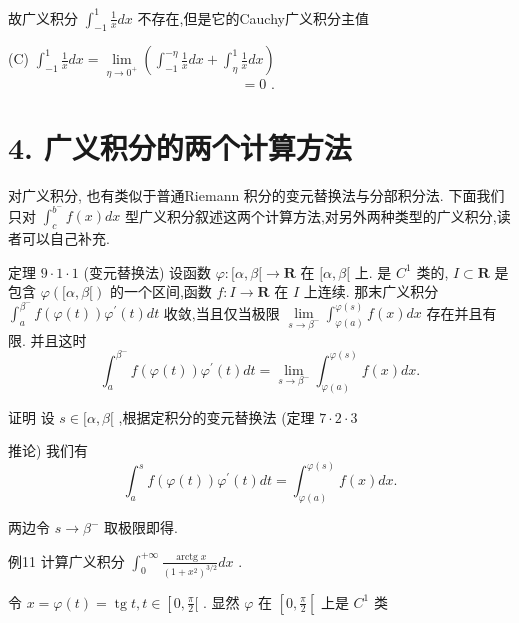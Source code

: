 故广义积分 ${\int }_{-1}^{1}\frac{1}{x}{dx}$ 不存在,但是它的Cauchy广义积分主值

(C) ${\int }_{-1}^{1}\frac{1}{x}{dx} = \mathop{\lim }\limits_{{\eta  \rightarrow  {0}^{ + }}}\left( {{\int }_{-1}^{-\eta }\frac{1}{x}{dx} + {\int }_{\eta }^{1}\frac{1}{x}{dx}}\right)$
$$= 0\text{ . }$$

\section*{4. 广义积分的两个计算方法}

对广义积分, 也有类似于普通Riemann 积分的变元替换法与分部积分法. 下面我们只对 ${\int }_{c}^{{b}^{ - }}f\left( x\right) {dx}$ 型广义积分叙述这两个计算方法,对另外两种类型的广义积分,读者可以自己补充.

定理 $9 \cdot  1 \cdot  1$ (变元替换法) 设函数 $\varphi  : \lbrack \alpha ,\beta \lbrack  \rightarrow  \mathbf{R}$ 在 $\lbrack \alpha ,\beta \lbrack$ 上. 是 ${C}^{1}$ 类的, $I \subset  \mathbf{R}$ 是包含 $\varphi \left( {\lbrack \alpha ,\beta \lbrack }\right)$ 的一个区间,函数 $f : I \rightarrow  \mathbf{R}$ 在 $I$ 上连续. 那末广义积分 ${\int }_{a}^{{\beta }^{ - }}f\left( {\varphi \left( t\right) }\right) {\varphi }^{\prime }\left( t\right) {dt}$ 收敛,当且仅当极限 $\mathop{\lim }\limits_{{s \rightarrow  {\beta }^{ - }}}{\int }_{\varphi \left( a\right) }^{\varphi \left( s\right) }f\left( x\right) {dx}$ 存在并且有限. 并且这时
$${\int }_{a}^{{\beta }^{ - }}f\left( {\varphi \left( t\right) }\right) {\varphi }^{\prime }\left( t\right) {dt} = \mathop{\lim }\limits_{{s \rightarrow  {\beta }^{ - }}}{\int }_{\varphi \left( a\right) }^{\varphi \left( s\right) }f\left( x\right) {dx}.$$

证明 设 $s \in  \lbrack \alpha ,\beta \lbrack$ ,根据定积分的变元替换法 (定理 $7 \cdot  2 \cdot  3$

推论) 我们有
$${\int }_{a}^{s}f\left( {\varphi \left( t\right) }\right) {\varphi }^{\prime }\left( t\right) {dt} = {\int }_{\varphi \left( a\right) }^{\varphi \left( s\right) }f\left( x\right) {dx}.$$

两边令 $s \rightarrow  {\beta }^{ - }$ 取极限即得.

例11 计算广义积分 ${\int }_{0}^{+\infty }\frac{\operatorname{arctg}x}{{\left( 1 + {x}^{2}\right) }^{3/2}}{dx}$ .

令 $x = \varphi \left( t\right)  = \operatorname{tg}t,t \in  \left\lbrack  {0,\frac{\pi }{2}\lbrack }\right.$ . 显然 $\varphi$ 在 $\left\lbrack  {0,\frac{\pi }{2}\left\lbrack  {\text{ 上是 }{C}^{1}}\right. }\right.$ 类


